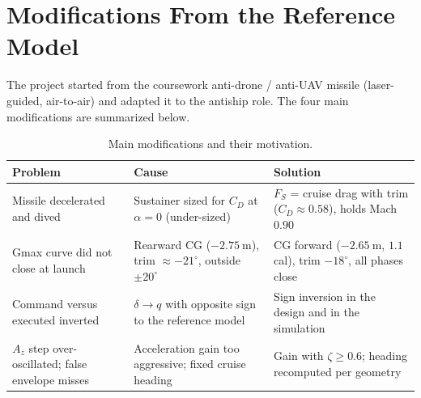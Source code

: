 \section{Modifications From the Reference Model}

The project started from the coursework anti-drone / anti-UAV missile (laser-guided, air-to-air) and adapted it to the antiship role. The four main modifications are summarized below.

\begin{table}[H]
\centering
\caption{Main modifications and their motivation.}
\begin{tabular}{p{}p{}p{}}
\toprule
Problem & Cause & Solution \\
\midrule
Missile decelerated and dived & Sustainer sized for $C_D$ at $\alpha=0$ (under-sized) & $F_S$ = cruise drag with trim ($C_D\approx 0.58$), holds Mach $0.90$ \\
Gmax curve did not close at launch & Rearward CG ($-2.75~\text{m}$), trim $\approx-21^\circ$, outside $\pm 20^\circ$ & CG forward ($-2.65~\text{m}$, $1.1$ cal), trim $-18^\circ$, all phases close \\
Command versus executed inverted & $\delta\rightarrow q$ with opposite sign to the reference model & Sign inversion in the design and in the simulation \\
$A_z$ step over-oscillated; false envelope misses & Acceleration gain too aggressive; fixed cruise heading & Gain with $\zeta\geq 0.6$; heading recomputed per geometry \\
\bottomrule
\end{tabular}
\end{table}
